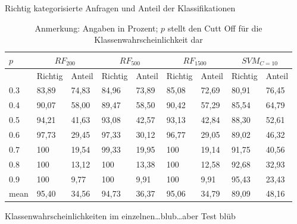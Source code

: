 \documentclass[]{article}
\begin{document}
\begin{table}[ht]
\centering
\caption{Richtig kategorisierte Anfragen und Anteil der Klassifikationen}
\begin{tabular}{lllllllll}
$p$   & \multicolumn{2}{c}{$RF_{200}$} & \multicolumn{2}{c}{$RF_{500}$} & \multicolumn{2}{c}{$RF_{1500}$} & \multicolumn{2}{c}{$SVM_{C = 10}$} \\
   \hline
    & Richtig      & Anteil      & Richtig      & Anteil      & Richtig       & Anteil      & Richtig     & Anteil    \\
   \hline
 0.3 &   83,89    &    74,83  &    84,96    &   73,89   &   85,08     &   72,69   &  80,91   &   76,45  \\
 0.4 &   90,07    &    58,00  &    89,47    &   58,50   &   90,42     &   57,29   &  85,54   &   64,79  \\
 0.5 &   94,21    &    41,63  &    93,08    &   42,57   &   93,13     &   42,84   &  88,30   &   52,61  \\
 0.6 &   97,73    &    29,45  &    97,33    &   30,12   &   96,77     &   29,05   &  89,02   &   46,32  \\
 0.7 &   100      &    19,54  &    99,33    &   19,95   &   100       &   19,14   &  91,75   &   40,56 \\
 0.8 &   100      &    13,12  &    100      &   13,38   &   100       &   12,58   &  92,68   &   32,93  \\
 0.9 &   100      &     9,77  &    100      &    9,91   &   100       &    9,91   &  95,43   &   23,43  \\
 \hline
mean   & 95,40    &   34,56   &    94,73    &   36,37   &   95,06     &   34,79   &  89,09   &   48,16  \\
  \hline
\end{tabular}
\caption*{\scriptsize Anmerkung: Angaben in Prozent; $p$ stellt den Cutt Off für die Klassenwahrscheinlichkeit dar}
\end{table}

Klassenwahrscheinlichkeiten im einzelnen\ldots{}blub\ldots{}aber Test
blüb
\end{document}
